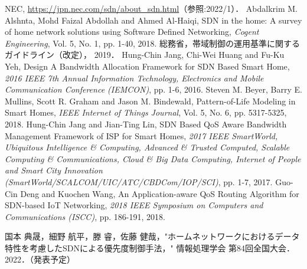 \documentclass[a4paper,11pt,uplatex]{ujreport}
\begin{document}
\begin{thebibliography}{99}
   NEC, \url{https://jpn.nec.com/sdn/about_sdn.html}（参照:2022/1）．
   Abdalkrim M. Alshnta, Mohd Faizal Abdollah and Ahmed Al-Haiqi, SDN in the home: A survey of home network solutions using Software Defined Networking, \textit{Cogent Engineering}, Vol. 5, No. 1, pp. 1-40, 2018.
   総務省，帯域制御の運用基準に関するガイドライン（改定）， 2019．
   Hung-Chin Jang, Chi-Wei Huang and Fu-Ku Yeh, Design
  A Bandwidth Allocation Framework for SDN Based Smart
  Home, \textit{2016 IEEE 7th Annual Information Technology, 
  Electronics and Mobile Communication Conference (IEMCON)}, 
  pp. 1-6, 2016.
   Steven M. Beyer, Barry E. Mullins, Scott R. Graham and Jason M. Bindewald, Pattern-of-Life Modeling in Smart Homes, \textit{IEEE Internet of Things Journal}, Vol. 5, No. 6, pp. 5317-5325, 2018.
   Hung-Chin Jang and Jian-Ting Lin, SDN Based QoS Aware Bandwidth Management Framework of ISP for Smart Homes, \textit{2017 IEEE SmartWorld, Ubiquitous Intelligence \& Computing, Advanced \& Trusted Computed, Scalable Computing \& Communications, Cloud \& Big Data Computing, Internet of People and Smart City Innovation (SmartWorld/SCALCOM/UIC/ATC/CBDCom/IOP/SCI)}, pp. 1-7, 2017.
   Guo-Cin Deng and Kuochen Wang, An Application-aware QoS Routing Algorithm for SDN-based IoT Networking, \textit{2018 IEEE Symposium on Computers and Communications (ISCC)}, pp. 186-191, 2018.
\end{thebibliography}

% 
% 

\label{chap:Bibiliography}

\renewcommand{\bibname}{研究業績}

\begin{thebibliography}{99}
  \bibitem{} 国本 典晟，細野 航平，滕 睿，佐藤 健哉，"ホームネットワークにおけるデータ特性を考慮したSDNによる優先度制御手法，" 情報処理学会 第84回全国大会．2022．（発表予定）
\end{thebibliography}

\label{chap:Publications}

\end{document}
